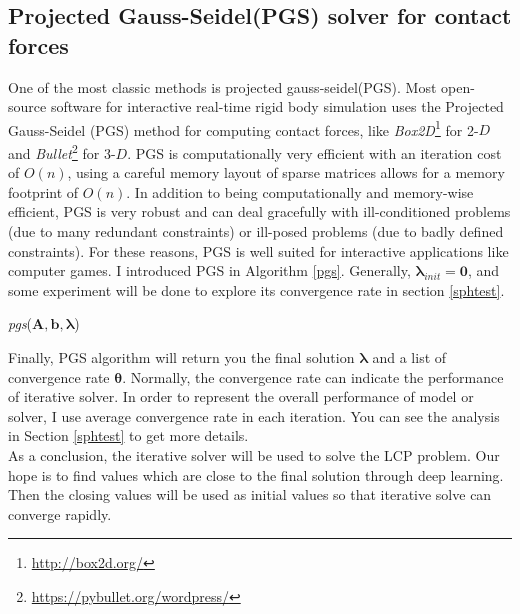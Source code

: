     \subsection{Projected Gauss-Seidel(PGS) solver for contact forces}
    One of the most classic methods is projected gauss-seidel(PGS). Most open-source software for interactive real-time rigid body simulation uses the Projected Gauss-Seidel (PGS) method for computing contact forces, like \textit{Box2D}\footnote{\url{http://box2d.org/}} for 2-$D$ and \textit{Bullet}\footnote{\url{https://pybullet.org/wordpress/}} for 3-$D$. PGS is computationally very efficient with an iteration cost of $O(n)$, using a careful memory layout of sparse matrices allows for a memory footprint of $O(n)$. In addition to being computationally and memory-wise efficient, PGS is very robust and can deal gracefully with ill-conditioned problems (due to many redundant constraints) or ill-posed problems (due to badly defined constraints). For these reasons, PGS is well suited for interactive applications like computer games. I introduced PGS in Algorithm \ref{pgs}. Generally, $\pmb{\lambda}_{init} = \pmb{0}$, and some experiment will be done to explore its convergence rate in section \ref{sphtest}.
    \begin{algorithm}[!h]
        \caption{\textit{pgs}($\pmb{A}, \pmb{b}, \pmb{\lambda}$)}
        \label{pgs}
    \end{algorithm}
    Finally, PGS algorithm will return you the final solution \(\pmb{\lambda}\) and a list of convergence rate $\pmb{\theta}$. Normally, the convergence rate can indicate the performance of iterative solver. In order to represent the overall performance of model or solver, I use average convergence rate in each iteration. You can see the analysis in Section \ref{sphtest} to get more details. \\

    As a conclusion, the iterative solver will be used to solve the LCP problem. Our hope is to find values which are close to the final solution through deep learning. Then the closing values will be used as initial values so that iterative solve can converge rapidly.